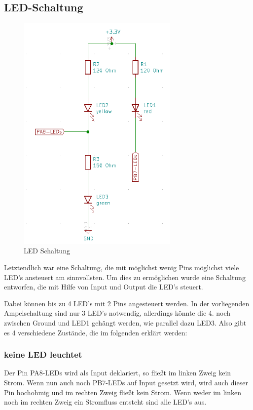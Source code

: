 \documentclass[a4paper,
DIV=13,
12pt,
BCOR=10mm,
department=FakEI,
parskip=half,
automark,
]{article}
\begin{document}
\subsection{LED-Schaltung}
\begin{figure}[!hbpt]
 \begin{center} \includegraphics[width=0.7\textwidth]{LED_Schaltung.png}
 \caption{LED Schaltung}
 \label{fig:Register}
  \end{center}
\end{figure}

Letztendlich war eine Schaltung, die mit möglichst wenig Pins möglichst viele LED's ansteuert am sinnvollsten. Um dies zu ermöglichen wurde eine Schaltung entworfen, die mit Hilfe von Input und Output die LED's steuert. 

Dabei können bis zu 4 LED's mit 2 Pins angesteuert werden. In der vorliegenden Ampelschaltung sind nur 3 LED's notwendig, allerdings könnte die 4. noch zwischen Ground und LED1 gehängt werden, wie parallel dazu LED3. Also gibt es 4 verschiedene Zustände, die im folgenden erklärt werden:

\subsubsection{keine LED leuchtet}
Der Pin \glqq PA8-LEDs\grqq{} wird als Input deklariert, so fließt im linken Zweig kein Strom. Wenn nun auch noch \glqq PB7-LEDs\grqq{} auf Input gesetzt wird, wird auch dieser Pin hochohmig und im rechten Zweig fließt kein Strom. Wenn weder im linken noch im rechten Zweig ein Stromfluss entsteht sind alle LED's aus.
\end{document}
